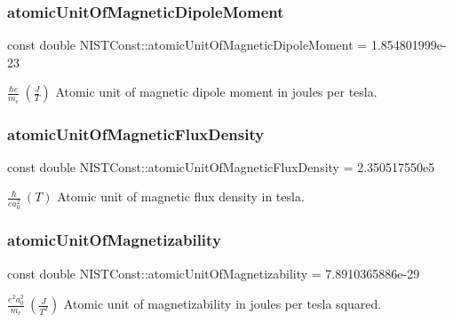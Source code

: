 \subsubsection{\texorpdfstring{atomic\+Unit\+Of\+Magnetic\+Dipole\+Moment}{atomicUnitOfMagneticDipoleMoment}}
{\footnotesize\ttfamily const double N\+I\+S\+T\+Const\+::atomic\+Unit\+Of\+Magnetic\+Dipole\+Moment = 1.\+854801999e-\/23}

$\frac{\hbar e}{m_e} \ (\frac{J}{T})$ Atomic unit of magnetic dipole moment in joules per tesla. \mbox{\label{group___n_i_s_t_const-_atomic_unit_gaaf4c9b5c25a5e1bee2f65c8a82e0ee63}} 
\subsubsection{\texorpdfstring{atomic\+Unit\+Of\+Magnetic\+Flux\+Density}{atomicUnitOfMagneticFluxDensity}}
{\footnotesize\ttfamily const double N\+I\+S\+T\+Const\+::atomic\+Unit\+Of\+Magnetic\+Flux\+Density = 2.\+350517550e5}

$\frac{\hbar}{e a_0^2} \ (T)$ Atomic unit of magnetic flux density in tesla. \mbox{\label{group___n_i_s_t_const-_atomic_unit_ga9c2b29b9a46e8dfd78837ef0c8a16bec}} 
\subsubsection{\texorpdfstring{atomic\+Unit\+Of\+Magnetizability}{atomicUnitOfMagnetizability}}
{\footnotesize\ttfamily const double N\+I\+S\+T\+Const\+::atomic\+Unit\+Of\+Magnetizability = 7.\+8910365886e-\/29}

$\frac{e^2a_0^2}{m_e} \ (\frac{J}{T^2})$ Atomic unit of magnetizability in joules per tesla squared. \mbox{\label{group___n_i_s_t_const-_atomic_unit_ga61a2da51489f7bb8965e9e4747db34a7}} 
